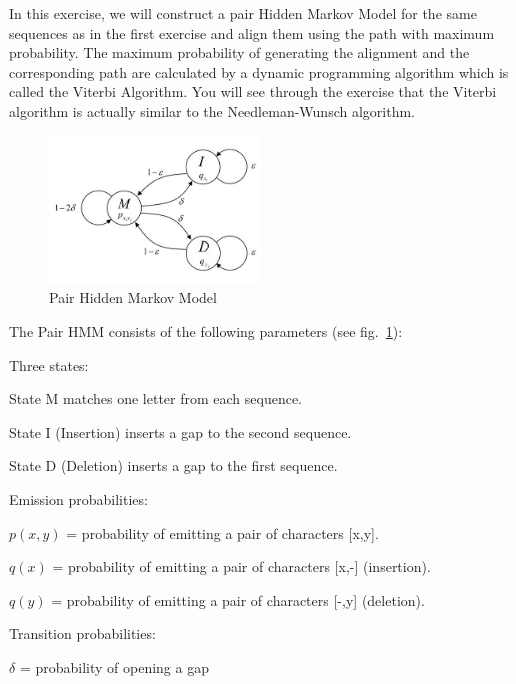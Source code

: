 \documentclass[a4paper,11pt]{article}
\begin{document}
In this exercise, we will construct a pair Hidden Markov Model for
the same sequences as in the first exercise and align them using the
path with maximum probability. The maximum probability of generating
the alignment and the corresponding path are calculated by a dynamic
programming algorithm which is called the Viterbi Algorithm. You will
see through the exercise that the Viterbi algorithm is actually similar
to the Needleman-Wunsch algorithm.


\begin{figure}[h]
\begin{center}
\includegraphics[width=0.5\textwidth]{HMM.jpg}
\caption{Pair Hidden Markov Model}
\label{fig:HMM}
\end{center}
\end{figure}


The Pair HMM consists of the following parameters (see fig.~\ref{fig:HMM}):

\vspace{0.5cm}

Three states:

State M matches one letter from each sequence.

State I (Insertion) inserts a gap to the second sequence.

State D (Deletion) inserts a gap to the first sequence.

\vspace{0.5cm}

Emission probabilities:

$p(x,y)$ = probability of emitting a pair of characters {[}x,y{]}.

$q(x)$ = probability of emitting a pair of characters {[}x,-{]} (insertion).

$q(y)$ = probability of emitting a pair of characters {[}-,y{]} (deletion).

\vspace{0.5cm}

Transition probabilities:

$\delta$ = probability of opening a gap
\end{document}
